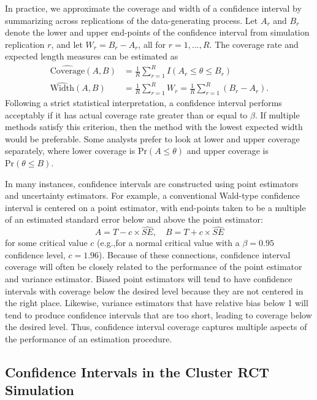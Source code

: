\documentclass[
]{book}
\newcommand{\Prob}{\text{Pr}}
\begin{document}
In practice, we approximate the coverage and width of a confidence interval by summarizing across replications of the data-generating process.
Let \(A_r\) and \(B_r\) denote the lower and upper end-points of the confidence interval from simulation replication \(r\), and let \(W_r = B_r - A_r\), all for \(r = 1,...,R\).
The coverage rate and expected length measures can be estimated as
\[
\begin{aligned}
\widehat{\text{Coverage}}(A,B) &= \frac{1}{R}\sum_{r=1}^R I(A_r \leq \theta \leq B_r) \\
\widehat{\text{Width}}(A,B) &= \frac{1}{R} \sum_{r=1}^R W_r = \frac{1}{R} \sum_{r=1}^R \left(B_r - A_r\right).
\end{aligned}
\label{eq:coverage-width}
\]
Following a strict statistical interpretation, a confidence interval performs acceptably if it has actual coverage rate greater than or equal to \(\beta\).
If multiple methods satisfy this criterion, then the method with the lowest expected width would be preferable. Some analysts prefer to look at lower and upper coverage separately, where lower coverage is \(\Prob(A \leq \theta)\) and upper coverage is \(\Prob(\theta \leq B)\).

In many instances, confidence intervals are constructed using point estimators and
uncertainty estimators.
For example, a conventional Wald-type confidence interval is centered on a point estimator, with end-points taken to be a multiple of an estimated standard error below and above the point estimator:
\[
A = T - c \times \widehat{SE}, \quad B = T + c \times \widehat{SE}
\]
for some critical value \(c\) (e.g.,for a normal critical value with a \(\beta = 0.95\) confidence level, \(c = 1.96\)).
Because of these connections, confidence interval coverage will often be closely related to the performance of the point estimator and variance estimator.
Biased point estimators will tend to have confidence intervals with coverage below the desired level because they are not centered in the right place.
Likewise, variance estimators that have relative bias below 1 will tend to produce confidence intervals that are too short, leading to coverage below the desired level.
Thus, confidence interval coverage captures multiple aspects of the performance of an estimation procedure.

\subsection{Confidence Intervals in the Cluster RCT Simulation}\label{cluster-RCT-CI-coverage}
\end{document}
